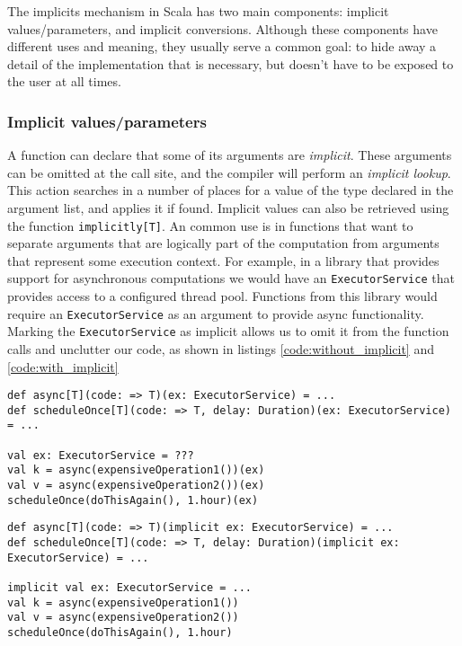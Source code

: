 The implicits mechanism in Scala has two main components: implicit values/parameters, and implicit conversions. Although these components have different uses and meaning, they usually serve a common goal: to hide away a detail of the implementation that is necessary, but doesn't have to be exposed to the user at all times.

\subsubsection{Implicit values/parameters}

A function can declare that some of its arguments are {\it implicit}. These arguments can be omitted at the call site, and the compiler will perform an {\it implicit lookup}. This action searches in a number of places for a value of the type declared in the argument list, and applies it if found. Implicit values can also be retrieved using the function \texttt{implicitly[T]}. An common use is in functions that want to separate arguments that are logically part of the computation from arguments that represent some execution context. For example, in a library that provides support for asynchronous computations we would have an \texttt{ExecutorService} that provides access to a configured thread pool. Functions from this library would require an \texttt{ExecutorService} as an argument to provide async functionality. Marking the \texttt{ExecutorService} as implicit allows us to omit it from the function calls and unclutter our code, as shown in listings \ref{code:without_implicit} and \ref{code:with_implicit}

\begin{lstlisting}[caption=Code without implicits, label=code:without_implicit]
def async[T](code: => T)(ex: ExecutorService) = ...
def scheduleOnce[T](code: => T, delay: Duration)(ex: ExecutorService) = ...

val ex: ExecutorService = ???
val k = async(expensiveOperation1())(ex)
val v = async(expensiveOperation2())(ex)
scheduleOnce(doThisAgain(), 1.hour)(ex)
\end{lstlisting}

\begin{lstlisting}[caption=Code with implicits, label=code:with_implicit, float]
def async[T](code: => T)(implicit ex: ExecutorService) = ...
def scheduleOnce[T](code: => T, delay: Duration)(implicit ex: ExecutorService) = ...

implicit val ex: ExecutorService = ...
val k = async(expensiveOperation1())
val v = async(expensiveOperation2())
scheduleOnce(doThisAgain(), 1.hour)
\end{lstlisting}

